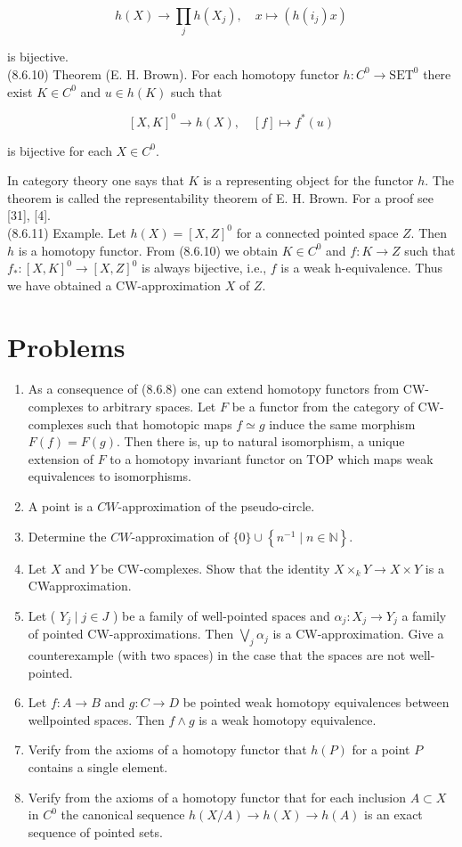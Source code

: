 \documentclass[10pt, letterpaper]{article}
\begin{document}
$$
h(X) \rightarrow \prod_{j} h\left(X_{j}\right), \quad x \mapsto\left(h\left(i_{j}\right) x\right)
$$

is bijective.\\
(8.6.10) Theorem (E. H. Brown). For each homotopy functor $h: C^{0} \rightarrow \mathrm{SET}^{0}$ there exist $K \in C^{0}$ and $u \in h(K)$ such that

$$
[X, K]^{0} \rightarrow h(X), \quad[f] \mapsto f^{*}(u)
$$

is bijective for each $X \in C^{0}$.

In category theory one says that $K$ is a representing object for the functor $h$. The theorem is called the representability theorem of E. H. Brown. For a proof see [31], [4].\\
(8.6.11) Example. Let $h(X)=[X, Z]^{0}$ for a connected pointed space $Z$. Then $h$ is a homotopy functor. From (8.6.10) we obtain $K \in C^{0}$ and $f: K \rightarrow Z$ such that $f_{*}:[X, K]^{0} \rightarrow[X, Z]^{0}$ is always bijective, i.e., $f$ is a weak h-equivalence. Thus we have obtained a CW-approximation $X$ of $Z$.

\section*{Problems}
\begin{enumerate}
  \item As a consequence of (8.6.8) one can extend homotopy functors from CW-complexes to arbitrary spaces. Let $F$ be a functor from the category of CW-complexes such that homotopic maps $f \simeq g$ induce the same morphism $F(f)=F(g)$. Then there is, up to natural isomorphism, a unique extension of $F$ to a homotopy invariant functor on TOP which maps weak equivalences to isomorphisms.
  \item A point is a $C W$-approximation of the pseudo-circle.
  \item Determine the $C W$-approximation of $\{0\} \cup\left\{n^{-1} \mid n \in \mathbb{N}\right\}$.
  \item Let $X$ and $Y$ be CW-complexes. Show that the identity $X \times_{k} Y \rightarrow X \times Y$ is a CWapproximation.
  \item Let ( $Y_{j} \mid j \in J$ ) be a family of well-pointed spaces and $\alpha_{j}: X_{j} \rightarrow Y_{j}$ a family of pointed CW-approximations. Then $\bigvee_{j} \alpha_{j}$ is a CW-approximation. Give a counterexample (with two spaces) in the case that the spaces are not well-pointed.
  \item Let $f: A \rightarrow B$ and $g: C \rightarrow D$ be pointed weak homotopy equivalences between wellpointed spaces. Then $f \wedge g$ is a weak homotopy equivalence.
  \item Verify from the axioms of a homotopy functor that $h(P)$ for a point $P$ contains a single element.
  \item Verify from the axioms of a homotopy functor that for each inclusion $A \subset X$ in $C^{0}$ the canonical sequence $h(X / A) \rightarrow h(X) \rightarrow h(A)$ is an exact sequence of pointed sets.
\end{enumerate}
\end{document}
